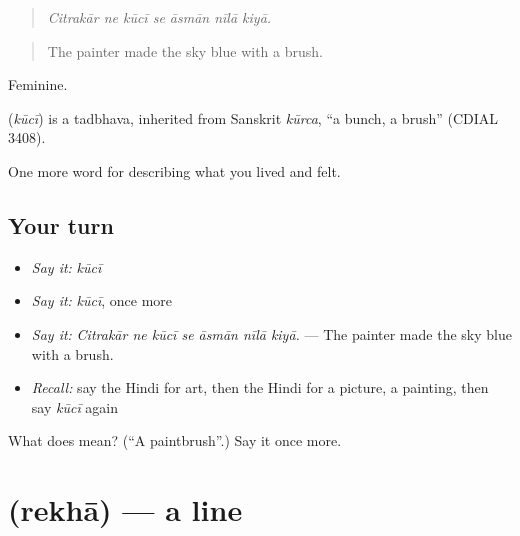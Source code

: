 \begin{quote}
      
\end{quote}

\begin{quote}
\emph{Citrakār ne kūcī se āsmān nīlā kiyā.}
\end{quote}

\begin{quote}
The painter made the sky blue with a brush.
\end{quote}

Feminine.

\begin{cousinweb}
\textbf{} (\emph{kūcī}) is a tadbhava, inherited from Sanskrit \emph{kūrca}, \textquotedblleft{}a bunch, a brush\textquotedblright{} (CDIAL 3408).
\end{cousinweb}

\begin{grammarlens}[title={What you've built}]
One more word for describing what you lived and felt.
\end{grammarlens}

\subsection*{Your turn}
\begin{itemize}
\raggedright
  \item \emph{Say it:} \emph{kūcī}
  \item \emph{Say it:} \emph{kūcī}, once more
  \item \emph{Say it:} \emph{Citrakār ne kūcī se āsmān nīlā kiyā.} — The painter made the sky blue with a brush.
  \item \emph{Recall:} say the Hindi for art, then the Hindi for a picture, a painting, then say \emph{kūcī} again
\end{itemize}

\begin{tcolorbox}[breakable,colback=teal!4,colframe=teal!35!black,title={Before you move on}]
What does  mean? (\textquotedblleft{}A paintbrush\textquotedblright{}.) Say it once more.
\end{tcolorbox}
\section[\texorpdfstring{\hi{रेखा} (rekhā)}{रेखा (rekhā)}]{ (rekhā) — a line}

\label{lesson:HI-C527-rekha}



